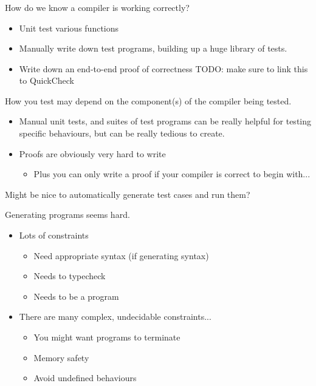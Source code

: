 \documentclass{beamer}
\begin{document}
\begin{frame}
  \frametitle{}

  How do we know a compiler is working correctly?

  \begin{itemize}
  \item Unit test various functions
  \item Manually write down test programs, building up a huge library
    of tests.
  \item Write down an end-to-end proof of correctness
    TODO: make sure to link this to QuickCheck
  \end{itemize}

  How you test may depend on the component(s) of the compiler being
  tested.


  \pause

  \begin{itemize}
  \item Manual unit tests, and suites of test programs can be really
    helpful for testing specific behaviours, but can be really tedious
    to create.
  \item Proofs are obviously very hard to write
    \begin{itemize}
    \item Plus you can only write a proof if your compiler is correct
      to begin with...
    \end{itemize}
  \end{itemize}

  \pause

  Might be nice to automatically generate test cases and run them?

\end{frame}

\begin{frame}

  Generating programs seems hard.

  \begin{itemize}
  \item Lots of constraints
    \begin{itemize}
    \item Need appropriate syntax (if generating syntax)
    \item Needs to typecheck
    \item Needs to be a program
    \end{itemize}
  \item There are many complex, undecidable constraints...
    \begin{itemize}
    \item You might want programs to terminate
    \item Memory safety
    \item Avoid undefined behaviours
    \end{itemize}
  \end{itemize}
\end{frame}
\end{document}
